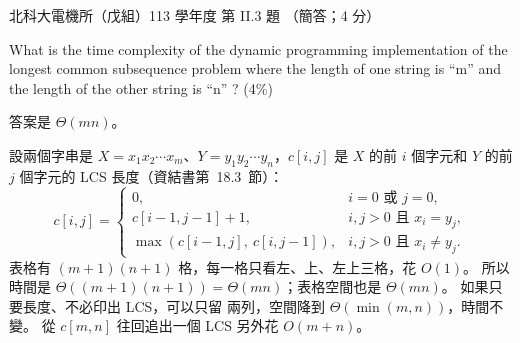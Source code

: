 \begin{pastexam}[label={px:ntut-113-ee-ds-07}]{北科大電機所（戊組）113 學年度 第 II.3 題}
（簡答；4 分）

What is the time complexity of the dynamic programming implementation of the longest common
subsequence problem where the length of one string is ``m'' and the length of the other string is
``n'' ? (4\%)
\end{pastexam}

\begin{pastsoln}
答案是 $\Theta(mn)$。

設兩個字串是 $X = x_1 x_2 \cdots x_m$、$Y = y_1 y_2 \cdots y_n$，$c[i, j]$ 是 $X$ 的前 $i$ 個字元和
$Y$ 的前 $j$ 個字元的 LCS 長度（資結書第~18.3~節）：
\[
c[i, j] = \begin{cases}
0, & i = 0 \text{ 或 } j = 0, \\
c[i-1, j-1] + 1, & i, j > 0 \text{ 且 } x_i = y_j, \\
\max(c[i-1, j],\ c[i, j-1]), & i, j > 0 \text{ 且 } x_i \ne y_j.
\end{cases}
\]
表格有 $(m + 1)(n + 1)$ 格，每一格只看左、上、左上三格，花 $O(1)$。 所以時間是
$\Theta((m+1)(n+1)) = \Theta(mn)$；表格空間也是 $\Theta(mn)$。 如果只要長度、不必印出 LCS，可以只留
兩列，空間降到 $\Theta(\min(m, n))$，時間不變。 從 $c[m, n]$ 往回追出一個 LCS 另外花 $O(m + n)$。
\end{pastsoln}
